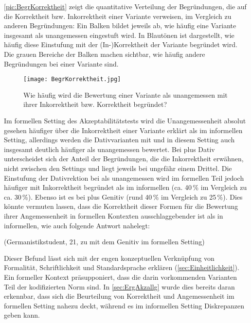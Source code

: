 \autoref{pic:BegrKorrektheit} zeigt die quantitative Verteilung der Begründungen, die auf die Korrektheit bzw. Inkorrektheit einer Variante verweisen, im Vergleich zu anderen Begründungen: 
Ein Balken bildet jeweils ab, wie häufig eine Variante insgesamt als unangemessen eingestuft wird. 
In Blautönen ist dargestellt, wie häufig diese Einstufung mit der (In-)Korrektheit der Variante begründet wird. 
Die grauen Bereiche der Balken machen sichtbar, wie häufig andere Begründungen bei einer Variante sind. 

\begin{figure}
\texttt{[image: BegrKorrektheit.jpg]}
\caption{Wie häufig wird die Bewertung einer Variante als unangemessen mit ihrer Inkorrektheit bzw. Korrektheit begründet?}
\label{pic:BegrKorrektheit}
\end{figure}

Im formellen Setting des Akzeptabilitätstests wird die Unangemessenheit absolut gesehen häufiger über die Inkorrektheit einer Variante erklärt als im informellen Setting, allerdings werden die Dativvarianten mit \wegen{} und \waehrend{} in diesem Setting auch insgesamt deutlich häufiger als unangemessen bewertet. 
Bei \wegen{} plus Dativ unterscheidet sich der Anteil der Begründungen, die die Inkorrektheit erwähnen, nicht zwischen den Settings und liegt jeweils bei ungefähr einem Drittel. 
Die Einstufung der Dativrektion bei \waehrend{} als unangemessen wird im formellen Teil jedoch häufiger mit Inkorrektheit begründet als im informellen (ca. 40\,\% im Vergleich zu ca. 30\,\%). 
Ebenso ist es bei \gegenueber{} plus Genitiv (rund 40\,\% im Vergleich zu 25\,\%). 
Dies könnte vermuten lassen, dass die Korrektheit dieser Formen für die Bewertung ihrer Angemessenheit in formellen Kontexten ausschlaggebender ist als in informellen, wie auch folgende Antwort nahelegt:\largerpage[2]

\begin{exe}
\ex {} (Germanistikstudent, 21, zu \gegenueber{} mit dem Genitiv im formellen Setting)
\end{exe} 

Dieser Befund lässt sich mit der engen konzeptuellen Verknüpfung von Formalität, Schriftlichkeit und Standardsprache erklären (\autoref{sec:Einheitlichkeit}). 
Ein formeller Kontext präsupponiert, dass die darin vorkommenden Varianten Teil der kodifizierten Norm sind. 
In \autoref{sec:ErgAkzallg} wurde dies bereits daran erkennbar, dass sich die Beurteilung von Korrektheit und Angemessenheit im formellen Setting nahezu deckt, während es im informellen Setting Diskrepanzen geben kann. 

